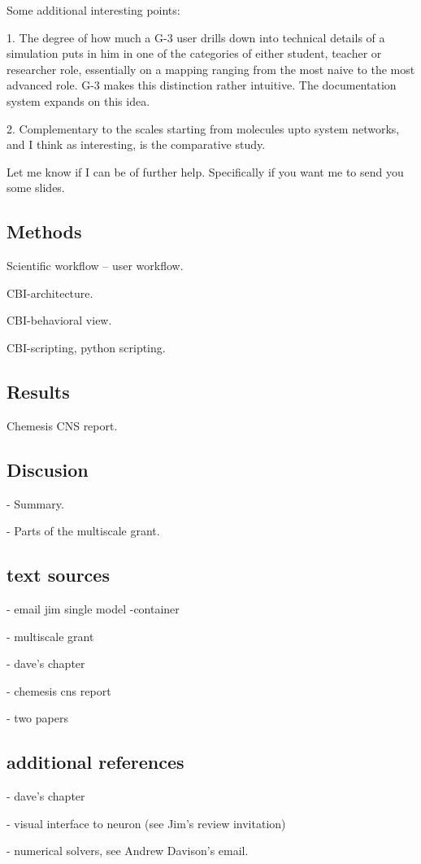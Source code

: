 \documentclass[12pt]{article}
\begin{document}
Some additional interesting points:

1. The degree of how much a G-3 user drills down into technical
details of a simulation puts in him in one of the categories of either
student, teacher or researcher role, essentially on a mapping ranging
from the most naive to the most advanced role.  G-3 makes this
distinction rather intuitive.  The documentation system expands on
this idea.

2. Complementary to the scales starting from molecules upto system
networks, and I think as interesting, is the comparative study.

Let me know if I can be of further help.  Specifically if you want me
to send you some slides.

\subsection*{Methods}

Scientific workflow -- user workflow.

CBI-architecture.

CBI-behavioral view.

CBI-scripting, python scripting.


\subsection*{Results}

Chemesis CNS report.


\subsection*{Discusion}

- Summary.

- Parts of the multiscale grant.


\subsection*{text sources}

- email jim single model -container

- multiscale grant

- dave's chapter

- chemesis cns report

- two papers


\subsection*{additional references}

- dave's chapter

- visual interface to neuron (see Jim's review invitation)

- numerical solvers, see Andrew Davison's email.





\end{document}
